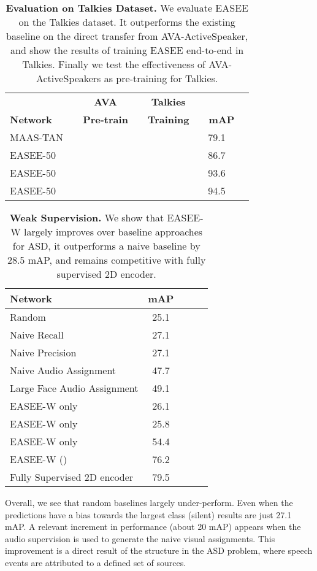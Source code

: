 \documentclass[10pt,twocolumn,letterpaper]{article}
\newcommand{\cmark}{\ding{51}}\newcommand{\xmark}{\ding{55}}
\begin{document}
\begin{table}[t]
    \centering

    \begin{tabular}{ l c c c c }
        \toprule
        \textbf{} & ~~\textbf{AVA} & ~~\textbf{Talkies } & ~~\textbf{} \\
        \textbf{Network} & ~~\textbf{Pre-train} & ~~\textbf{Training} & ~~\textbf{mAP} \\
        \midrule
        MAAS-TAN \cite{leon2021maas} & \cmark & \xmark & 79.1 \\
        EASEE-50 & \cmark & \xmark & 86.7 \\
        EASEE-50 & \xmark & \cmark & 93.6 \\
        EASEE-50 & \cmark & \cmark & 94.5 \\
       
        \toprule
    \end{tabular}
    \caption{\textbf{Evaluation on Talkies Dataset.} We evaluate EASEE on the Talkies dataset. It outperforms the existing baseline on the direct transfer from AVA-ActiveSpeaker, and show the results of training EASEE end-to-end in Talkies. Finally we test the effectiveness of AVA-ActiveSpeakers as pre-training for Talkies.
    }
    \label{tab:talkies}
\end{table} \begin{table}[t]
    \centering
    \begin{tabular}{ l c c c c }
        \toprule
        \textbf{Network} &\textbf{mAP} \\
        \midrule
        Random & 25.1\\
        Naive Recall & 27.1\\
        Naive Precision & 27.1\\
        \midrule
        Naive Audio Assignment &  47.7\\
        Large Face Audio Assignment & 49.1\\
        \midrule
        EASEE-W  only & 26.1\\
        EASEE-W  only & 25.8 \\
        EASEE-W  only & 54.4 \\
        EASEE-W  () & 76.2\\
        Fully Supervised 2D encoder \cite{roth2020ava,alcazar2020active} & 79.5\\
        \toprule
    \end{tabular}
    \caption{\textbf{Weak Supervision.} We show that EASEE-W largely improves over baseline approaches for ASD, it outperforms a naive baseline by 28.5 mAP, and remains competitive with fully supervised 2D encoder.  
    }
    \label{tab:weak}
\end{table} 
Overall, we see that random baselines largely under-perform. Even when the predictions have a bias towards the largest class (silent) results are just 27.1 mAP. A relevant increment in performance (about 20 mAP) appears when the audio supervision is used to generate the naive visual assignments. This improvement is a direct result of the structure in the ASD problem, where speech events are attributed to a defined set of sources.
\end{document}
